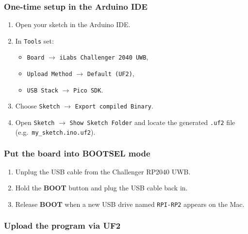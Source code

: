 \documentclass[a4paper,11pt]{article}
\begin{document}
\subsubsection{One-time setup in the Arduino IDE}

\begin{tcolorbox}[title=Step 1: IDE configuration,colback=accentlight!60!white]
	\begin{enumerate}
		\item Open your sketch in the Arduino IDE.
		\item In \texttt{Tools} set:
		\begin{itemize}
			\item \texttt{Board} $\rightarrow$ \texttt{iLabs Challenger 2040 UWB},
			\item \texttt{Upload Method} $\rightarrow$ \texttt{Default (UF2)},
			\item \texttt{USB Stack} $\rightarrow$ \texttt{Pico SDK}.
		\end{itemize}
		\item Choose \texttt{Sketch} $\rightarrow$ \texttt{Export compiled Binary}.
		\item Open \texttt{Sketch} $\rightarrow$ \texttt{Show Sketch Folder} and locate the
		generated \texttt{.uf2} file (e.g.\ \texttt{my\_sketch.ino.uf2}).
	\end{enumerate}
\end{tcolorbox}

\subsubsection{Put the board into BOOTSEL mode}

\begin{tcolorbox}[title=Step 2: Enter BOOTSEL mode,colback=accentlight!60!white]
	\begin{enumerate}
		\item Unplug the USB cable from the Challenger RP2040 UWB.
		\item Hold the \textbf{BOOT} button and plug the USB cable back in.
		\item Release \textbf{BOOT} when a new USB drive named \texttt{RPI-RP2} appears on the Mac.
	\end{enumerate}
\end{tcolorbox}

\subsubsection{Upload the program via UF2}
\end{document}

